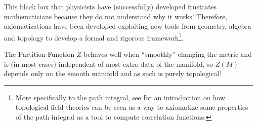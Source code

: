 \noindent This black box that physicists have (successfully) developed frustrates mathematicians because they do not understand why it works!
Therefore, axiomatizations have been developed exploiting new tools from geometry, algebra and topology to develop a formal and rigorous framework\footnote{More specifically to the path integral, see \cite[2.1]{Carqueville_2018} for an introduction on how topological field theories can be seen as a way to axiomatize some properties of the path integral as a tool to compute correlation functions.}.

\noindent The Partition Function $Z$ behaves well when ``smoothly'' changing the metric and is (in most cases) independent of most extra data of the manifold, so $Z(M)$ depends only on the smooth manifold and as such is purely topological!

\bigskip

